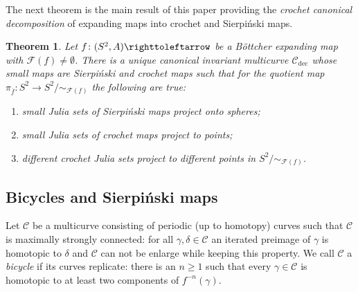 \documentclass{amsart}
\newtheorem{maintheorem}{Theorem}
\theoremstyle{plain}
\theoremstyle{definition}
\theoremstyle{remark}
\newcommand{\reminder}[1]{\textsl{$\lhd\rhd$#1$\lhd\rhd$}\marginpar{$\lhd\rhd\lhd\rhd\lhd\rhd$}}%
\newcommand{\hide}[1]{}
\newcommand{\Fat}{{\mathcal F}}
\newcommand{\CC}{{\mathcal C}}
\newcommand\selfmap{\righttoleftarrow}
\newcommand{\cro}{{\operatorname{dec}}}
\begin{document}
The next theorem is the main result of this paper providing the \emph{crochet canonical decomposition} of expanding maps into crochet and Sierpi\'{n}ski maps.

\begin{maintheorem}
\label{thm:cro decomp}
Let $f\colon(S^2,A)\selfmap$ be a B\"ottcher expanding map with $\Fat(f)\not=\emptyset$.  There is a unique canonical invariant multicurve $\CC_\cro$ whose small maps are Sierpi\'{n}ski and crochet maps such that for the quotient map $\pi_{\overline{f}}\colon S^2\to S^2/{\sim_{\Fat(f)}}$ the following are true:
\begin{enumerate}[label=\text{(\roman*)},font=\normalfont,leftmargin=*]
\item  small Julia sets of Sierpi\'{n}ski maps project onto spheres;
\item small Julia sets of crochet maps project to points;
\item  different crochet Julia sets project to different points in $S^2/{\sim_{\Fat(f)}}$.
\end{enumerate}
\end{maintheorem}  
  
  \subsection{Bicycles and Sierpi\'{n}ski maps} Let $\CC$ be a multicurve consisting of periodic (up to homotopy) curves such that $\CC$ is maximally strongly connected: for all $\gamma,\delta\in\CC$ an iterated preimage of $\gamma$ is homotopic to $\delta$ and $\CC$ can not be enlarge while keeping this property.  We call $\CC$ a \emph{bicycle} if its curves replicate: there is an $n\ge 1$ such that every $\gamma\in \CC$ is homotopic to at least two components of $f^{-n}(\gamma)$. 
  
  
  
  
\end{document}
